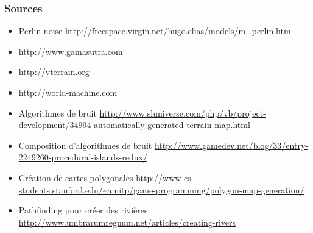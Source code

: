 \documentclass[hyperref={pdfpagelabels=false}]{beamer}
\begin{document}
\begin{frame}
  \frametitle{Sources}
  \begin{itemize}
  \item Perlin noise {\tiny \url{http://freespace.virgin.net/hugo.elias/models/m_perlin.htm}}
  \item http://www.gamasutra.com
  \item http://vterrain.org
  \item http://world-machine.com
  \item Algorithmes de bruit {\tiny \url{http://www.sluniverse.com/php/vb/project-development/34994-automatically-generated-terrain-map.html}}
  \item Composition d'algorithmes de bruit {\tiny \url{http://www.gamedev.net/blog/33/entry-2249260-procedural-islands-redux/}}
  \item Création de cartes polygonales {\tiny \url{http://www-cs-students.stanford.edu/~amitp/game-programming/polygon-map-generation/}}
  \item Pathfinding pour créer des rivières {\tiny \url{http://www.umbrarumregnum.net/articles/creating-rivers}}
  \end{itemize}
\end{frame}
\end{document}
